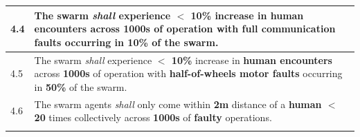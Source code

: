 \documentclass[runningheads]{llncs}
\begin{document}
\begin{table}[!t]
\begin{tabular}{p{5mm} p{125mm} }
4.4 & The swarm \emph{shall} experience \textbf{$<$ 10\%} increase in \textbf{human encounters} across \textbf{1000s} of operation with \textbf{full communication faults} occurring in \textbf{10\%} of the swarm. \\
\hline
4.5 & The swarm \emph{shall} experience \textbf{$<$ 10\%} increase in \textbf{human encounters }across \textbf{1000s} of operation with \textbf{half-of-wheels motor faults} occurring in \textbf{50\%} of the swarm.\\
\hline
4.6 & The swarm agents \emph{shall} only come within \textbf{2m} distance of a \textbf{human $<$ 20} times collectively across \textbf{1000s} of \textbf{faulty} operations.
\\				
\hline \\[-1\medskipamount]		
	\end{tabular}
\vspace{-4ex}
\end{table}
%
\end{document}
